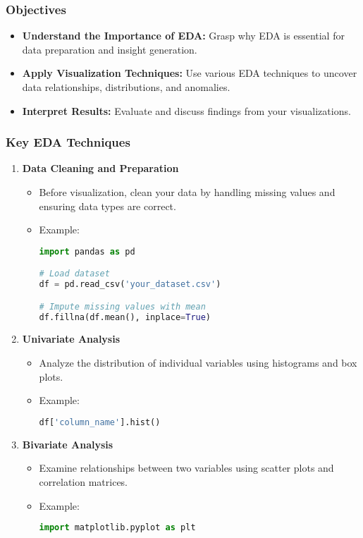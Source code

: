 \documentclass[aspectratio=169]{beamer}
\begin{document}
\begin{frame}[fragile]
    \frametitle{Objectives}
    \begin{itemize}
        \item \textbf{Understand the Importance of EDA:} Grasp why EDA is essential for data preparation and insight generation.
        \item \textbf{Apply Visualization Techniques:} Use various EDA techniques to uncover data relationships, distributions, and anomalies.
        \item \textbf{Interpret Results:} Evaluate and discuss findings from your visualizations.
    \end{itemize}
\end{frame}

\begin{frame}[fragile]
    \frametitle{Key EDA Techniques}
    \begin{enumerate}
        \item \textbf{Data Cleaning and Preparation}
            \begin{itemize}
                \item Before visualization, clean your data by handling missing values and ensuring data types are correct.
                \item Example:
                \begin{lstlisting}[language=Python]
import pandas as pd

# Load dataset
df = pd.read_csv('your_dataset.csv')

# Impute missing values with mean
df.fillna(df.mean(), inplace=True)
                \end{lstlisting}
            \end{itemize}
        \item \textbf{Univariate Analysis}
            \begin{itemize}
                \item Analyze the distribution of individual variables using histograms and box plots.
                \item Example:
                \begin{lstlisting}[language=Python]
df['column_name'].hist()
                \end{lstlisting}
            \end{itemize}  
        \item \textbf{Bivariate Analysis}
            \begin{itemize}
                \item Examine relationships between two variables using scatter plots and correlation matrices.
                \item Example:
                \begin{lstlisting}[language=Python]
import matplotlib.pyplot as plt


\end{lstlisting}
\end{itemize}
\end{enumerate}
\end{frame}
\end{document}
